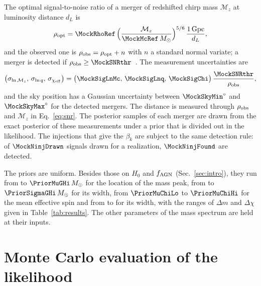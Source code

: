 \documentclass[aps,prd,reprint,amsmath,amssymb,nofootinbib]{revtex4-2}
\newcommand{\Msun}{\,M_\odot}
\newcommand{\fAGN}{f_{\rm AGN}}
\newcommand{\chieff}{\chi_{\rm eff}}
\begin{document}
The optimal signal-to-noise ratio of a merger of redshifted chirp mass $\mathcal{M}_z$ at luminosity distance $d_L$ is
\begin{equation}
\rho_{\rm opt}=\MockRhoRef\,\Big(\frac{\mathcal{M}_z}{\MockMcRef\Msun}\Big)^{5/6}\,\frac{1\,{\rm Gpc}}{d_L},
\label{eq:snr}
\end{equation}
and the observed one is $\rho_{\rm obs}=\rho_{\rm opt}+n$ with $n$ a standard normal variate; a merger is detected if $\rho_{\rm obs}\geq\MockSNRthr$~\cite{Farah:2023vsc,Essick:2023upv}.
The measurement uncertainties are
\begin{equation}
\big(\sigma_{\ln\mathcal{M}_z},\,\sigma_{\ln q},\,\sigma_{\chieff}\big)=\big(\MockSigLnMc,\,\MockSigLnq,\,\MockSigChi\big)\,\frac{\MockSNRthr}{\rho_{\rm obs}},
\label{eq:widths}
\end{equation}
and the sky position has a Gaussian uncertainty between $\MockSkyMin^\circ$ and $\MockSkyMax^\circ$ for the detected mergers.
The distance is measured through $\rho_{\rm obs}$ and $\mathcal{M}_z$ in Eq.~\eqref{eq:snr}.
The posterior samples of each merger are drawn from the exact posterior of these measurements under a prior that is divided out in the likelihood.
The injections that give the $\beta_k$ are subject to the same detection rule: of $\MockNinjDrawn$ signals drawn for a realization, $\MockNinjFound$ are detected.

The priors are uniform.
Besides those on $H_0$ and $\fAGN$ (Sec.~\ref{sec:intro}), they run from \PriorMuGLo{} to $\PriorMuGHi\Msun$ for the location of the mass peak, from \PriorSigmaGLo{} to $\PriorSigmaGHi\Msun$ for its width, from $\PriorMuChiLo$ to $\PriorMuChiHi$ for the mean effective spin and from \PriorSigmaChiLo{} to \PriorSigmaChiHi{} for its width, with the ranges of $\Delta m$ and $\Delta\chi$ given in Table~\ref{tab:results}.
The other parameters of the mass spectrum are held at their inputs.

\section{Monte Carlo evaluation of the likelihood}
\label{app:mc}
\end{document}
